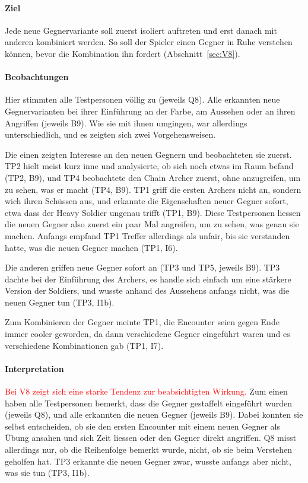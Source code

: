 \documentclass[../Main.tex]{subfiles}
\begin{document}
\paragraph{Ziel}
Jede neue Gegnervariante soll zuerst isoliert auftreten und erst danach mit anderen kombiniert werden. So soll der Spieler einen Gegner in Ruhe verstehen können, bevor die Kombination ihn fordert (Abschnitt~\ref{sec:V8}).

\paragraph{Beobachtungen}
Hier stimmten alle Testpersonen völlig zu (jeweils Q8). Alle erkannten neue Gegnervarianten bei ihrer Einführung an der Farbe, am Aussehen oder an ihren Angriffen (jeweils B9). Wie sie mit ihnen umgingen, war allerdings unterschiedlich, und es zeigten sich zwei Vorgehensweisen.

Die einen zeigten Interesse an den neuen Gegnern und beobachteten sie zuerst. TP2 hielt meist kurz inne und analysierte, ob sich noch etwas im Raum befand (TP2, B9), und TP4 beobachtete den Chain Archer zuerst, ohne anzugreifen, um zu sehen, was er macht (TP4, B9). TP1 griff die ersten Archers nicht an, sondern wich ihren Schüssen aus, und erkannte die Eigenschaften neuer Gegner sofort, etwa dass der Heavy Soldier ungenau trifft (TP1, B9). Diese Testpersonen liessen die neuen Gegner also zuerst ein paar Mal angreifen, um zu sehen, was genau sie machen. Anfangs empfand TP1 Treffer allerdings als unfair, bis sie verstanden hatte, was die neuen Gegner machen (TP1, I6).

Die anderen griffen neue Gegner sofort an (TP3 und TP5, jeweils B9). TP3 dachte bei der Einführung des Archers, es handle sich einfach um eine stärkere Version der Soldiers, und wusste anhand des Aussehens anfangs nicht, was die neuen Gegner tun (TP3, I1b).

Zum Kombinieren der Gegner meinte TP1, die Encounter seien gegen Ende immer cooler geworden, da dann verschiedene Gegner eingeführt waren und es verschiedene Kombinationen gab (TP1, I7).

\paragraph{Interpretation}
\textcolor{red}{Bei V8 zeigt sich eine starke Tendenz zur beabsichtigten Wirkung.} Zum einen haben alle Testpersonen bemerkt, dass die Gegner gestaffelt eingeführt wurden (jeweils Q8), und alle erkannten die neuen Gegner (jeweils B9). Dabei konnten sie selbst entscheiden, ob sie den ersten Encounter mit einem neuen Gegner als Übung ansahen und sich Zeit liessen oder den Gegner direkt angriffen. Q8 misst allerdings nur, ob die Reihenfolge bemerkt wurde, nicht, ob sie beim Verstehen geholfen hat. TP3 erkannte die neuen Gegner zwar, wusste anfangs aber nicht, was sie tun (TP3, I1b).
\end{document}
